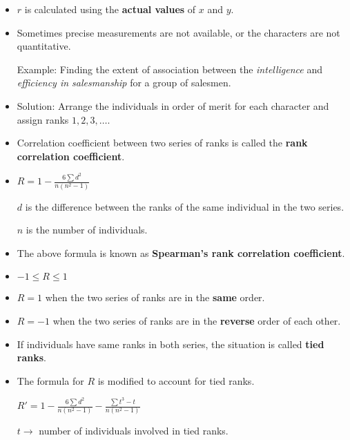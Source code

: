 \begin{itemize}
    \item $r$ is calculated using the \textbf{actual values} of $x$ and $y$.

    \item Sometimes precise measurements are not available, or the characters are not quantitative.

        Example: Finding the extent of association between the \textit{intelligence} and \textit{efficiency in salesmanship} for a group of salesmen.

    \item Solution: Arrange the individuals in order of merit for each character and assign ranks $1, 2, 3, \dots$.

    \item Correlation coefficient between two series of ranks is called the \textbf{rank correlation coefficient}.

    \item $R = 1 - \frac{6 \sum d^2}{n(n^2 - 1)}$

        $d$ is the difference between the ranks of the same individual in the two series.

        $n$ is the number of individuals.

    \item The above formula is known as \textbf{Spearman's rank correlation coefficient}.

    \item $-1 \leq R \leq 1$

    \item $R = 1$ when the two series of ranks are in the \textbf{same} order.

    \item $R = -1$ when the two series of ranks are in the \textbf{reverse} order of each other.

    \item If individuals have same ranks in both series, the situation is called \textbf{tied ranks}.

    \item The formula for $R$ is modified to account for tied ranks.

        $R' = 1 - \frac{6 \sum d^2}{n(n^2 - 1)} - \frac{\sum t^3 - t}{n(n^2 - 1)}$

        $t \rightarrow$ number of individuals involved in tied ranks.
\end{itemize}
